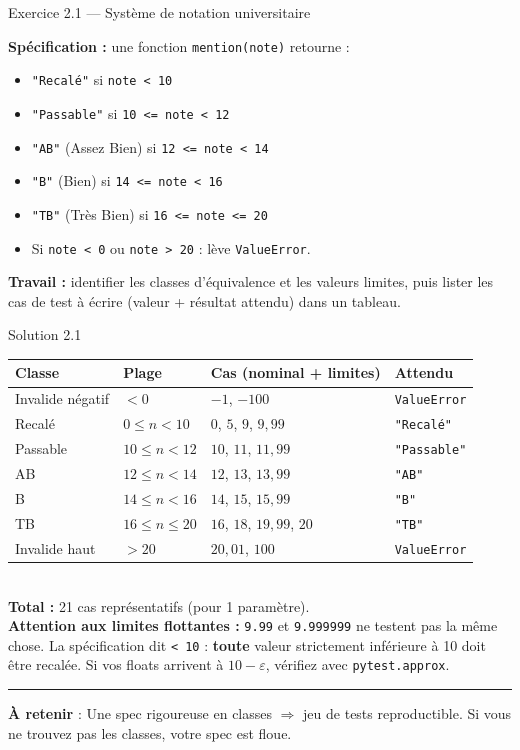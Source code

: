 \documentclass[aspectratio=169,11pt]{beamer}
\newcommand{\takeaway}[1]{%
\vfill\begin{beamercolorbox}[wd=\linewidth,sep=0.4em]{}
\color{accent2}\rule[0.6ex]{1.2em}{1.2pt}\hspace{0.4em}%
\textbf{\color{accent2}\small À retenir} \textcolor{textsoft}{:} %
{\small\color{textmain}#1}
\end{beamercolorbox}}
\begin{document}
\begin{frame}[t]{Exercice 2.1 --- Système de notation universitaire}
\begin{exercice}
\textbf{Spécification :} une fonction \texttt{mention(note)} retourne :
\begin{itemize}\itemsep0.05em
\item \texttt{"Recalé"} si \texttt{note < 10}
\item \texttt{"Passable"} si \texttt{10 <= note < 12}
\item \texttt{"AB"} (Assez Bien) si \texttt{12 <= note < 14}
\item \texttt{"B"} (Bien) si \texttt{14 <= note < 16}
\item \texttt{"TB"} (Très Bien) si \texttt{16 <= note <= 20}
\item Si \texttt{note < 0} ou \texttt{note > 20} : lève \texttt{ValueError}.\\[0.4em]
\end{itemize}
\textbf{Travail :} identifier les classes d'équivalence et les valeurs limites, puis lister les cas de test à écrire (valeur + résultat attendu) dans un tableau.
\end{exercice}
\end{frame}

\begin{frame}[t,shrink=10]{Solution 2.1}
\scriptsize
\begin{tabular}{@{}l l l l@{}}
\toprule
\textbf{Classe} & \textbf{Plage} & \textbf{Cas (nominal + limites)} & \textbf{Attendu}\\
\midrule
Invalide négatif & $< 0$ & $-1$, $-100$ & \texttt{ValueError} \\
Recalé & $0 \le n < 10$ & $0$, $5$, $9$, $9{,}99$ & \texttt{"Recalé"} \\
Passable & $10 \le n < 12$ & $10$, $11$, $11{,}99$ & \texttt{"Passable"} \\
AB & $12 \le n < 14$ & $12$, $13$, $13{,}99$ & \texttt{"AB"} \\
B & $14 \le n < 16$ & $14$, $15$, $15{,}99$ & \texttt{"B"} \\
TB & $16 \le n \le 20$ & $16$, $18$, $19{,}99$, $20$ & \texttt{"TB"} \\
Invalide haut & $> 20$ & $20{,}01$, $100$ & \texttt{ValueError} \\
\bottomrule
\end{tabular}
\vspace{0.4cm}\footnotesize
\\
\textbf{Total :} 21 cas représentatifs (pour 1 paramètre).\\[0.3em]
\textbf{Attention aux limites flottantes :} \texttt{9.99} et \texttt{9.999999} ne testent pas la même chose. La spécification dit \texttt{< 10} : \textbf{toute} valeur strictement inférieure à 10 doit être recalée. Si vos floats arrivent à $10 - \varepsilon$, vérifiez avec \texttt{pytest.approx}.
\takeaway{Une spec rigoureuse en classes $\Rightarrow$ jeu de tests reproductible. Si vous ne trouvez pas les classes, votre spec est floue.}
\end{frame}
\end{document}
